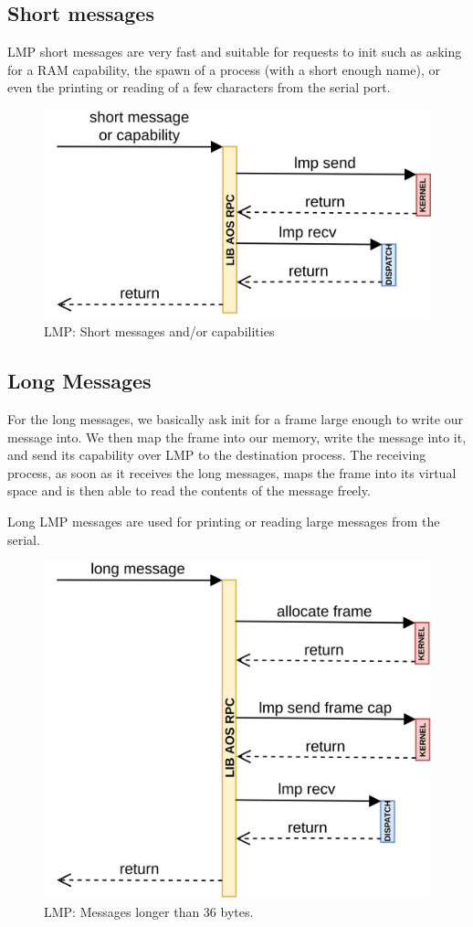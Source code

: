 \documentclass[a4paper,twoside,openright]{report}
\begin{document}
\subsection{Short messages}

LMP short messages are very fast and suitable for requests to init such as asking for a RAM capability, 
the spawn of a process (with a short enough name), or even the printing or reading of a few characters
from the serial port.

\begin{figure} [H]
	\centering
	\includegraphics[width=0.7\linewidth]{assets/lmp-short}
	\caption{LMP: Short messages and/or capabilities}
	\label{fig:lmp-short}
\end{figure}

\subsection{Long Messages}
For the long messages, we basically ask init for a frame large enough to write our message into.
We then map the frame into our memory, write the message into it, and send its capability over
LMP to the destination process.
The receiving process, as soon as it receives the long messages, maps the frame into its virtual space
and is then able to read the contents of the message freely.

Long LMP messages are used for printing or reading large messages from the serial.

\begin{figure} [H]
	\centering
	\includegraphics[width=0.7\linewidth]{assets/lmp-long}
	\caption{LMP: Messages longer than 36 bytes.}
	\label{fig:lmp-long}
\end{figure}
\end{document}

